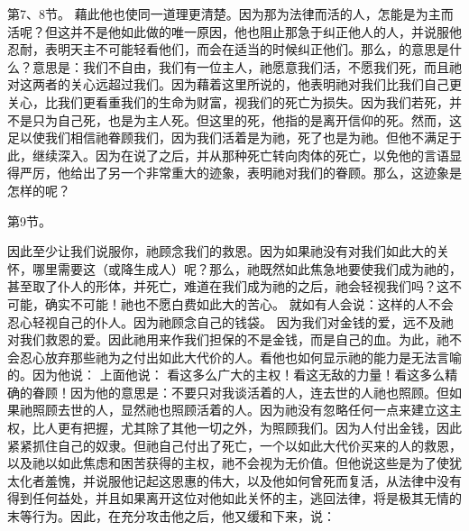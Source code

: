 第7、8节。 藉此他也使同一道理更清楚。因为那为法律而活的人，怎能是为主而活呢？但这并不是他如此做的唯一原因，他也阻止那急于纠正他人的人，并说服他忍耐，表明天主不可能轻看他们，而会在适当的时候纠正他们。那么，的意思是什么？意思是：我们不自由，我们有一位主人，祂愿意我们活，不愿我们死，而且祂对这两者的关心远超过我们。因为藉着这里所说的，他表明祂对我们比我们自己更关心，比我们更看重我们的生命为财富，视我们的死亡为损失。因为我们若死，并不是只为自己死，也是为主人死。但这里的死，他指的是离开信仰的死。然而，这足以使我们相信祂眷顾我们，因为我们活着是为祂，死了也是为祂。但他不满足于此，继续深入。因为在说了之后，并从那种死亡转向肉体的死亡，以免他的言语显得严厉，他给出了另一个非常重大的迹象，表明祂对我们的眷顾。那么，这迹象是怎样的呢？\par

第9节。\par

因此至少让我们说服你，祂顾念我们的救恩。因为如果祂没有对我们如此大的关怀，哪里需要这（或降生成人）呢？那么，祂既然如此焦急地要使我们成为祂的，甚至取了仆人的形体，并死亡，难道在我们成为祂的之后，祂会轻视我们吗？这不可能，确实不可能！祂也不愿白费如此大的苦心。 就如有人会说：这样的人不会忍心轻视自己的仆人。因为祂顾念自己的钱袋。 因为我们对金钱的爱，远不及祂对我们救恩的爱。因此祂用来作我们担保的不是金钱，而是自己的血。为此，祂不会忍心放弃那些祂为之付出如此大代价的人。看他也如何显示祂的能力是无法言喻的。因为他说： 上面他说： 看这多么广大的主权！看这无敌的力量！看这多么精确的眷顾！因为他的意思是：不要只对我谈活着的人，连去世的人祂也照顾。但如果祂照顾去世的人，显然祂也照顾活着的人。因为祂没有忽略任何一点来建立这主权，比人更有把握，尤其除了其他一切之外，为照顾我们。因为人付出金钱，因此紧紧抓住自己的奴隶。但祂自己付出了死亡，一个以如此大代价买来的人的救恩，以及祂以如此焦虑和困苦获得的主权，祂不会视为无价值。但他说这些是为了使犹太化者羞愧，并说服他记起这恩惠的伟大，以及他如何曾死而复活，从法律中没有得到任何益处，并且如果离开这位对他如此关怀的主，逃回法律，将是极其无情的末等行为。因此，在充分攻击他之后，他又缓和下来，说：\par

